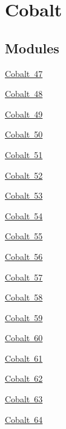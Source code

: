 \hypertarget{group___isotope_const-_cobalt}{}\section{Cobalt}
\label{group___isotope_const-_cobalt}
\subsection*{Modules}
\begin{DoxyCompactItemize}
\item 
\mbox{\hyperlink{group___isotope_const-_cobalt-_co47}{Cobalt 47}}
\item 
\mbox{\hyperlink{group___isotope_const-_cobalt-_co48}{Cobalt 48}}
\item 
\mbox{\hyperlink{group___isotope_const-_cobalt-_co49}{Cobalt 49}}
\item 
\mbox{\hyperlink{group___isotope_const-_cobalt-_co50}{Cobalt 50}}
\item 
\mbox{\hyperlink{group___isotope_const-_cobalt-_co51}{Cobalt 51}}
\item 
\mbox{\hyperlink{group___isotope_const-_cobalt-_co52}{Cobalt 52}}
\item 
\mbox{\hyperlink{group___isotope_const-_cobalt-_co53}{Cobalt 53}}
\item 
\mbox{\hyperlink{group___isotope_const-_cobalt-_co54}{Cobalt 54}}
\item 
\mbox{\hyperlink{group___isotope_const-_cobalt-_co55}{Cobalt 55}}
\item 
\mbox{\hyperlink{group___isotope_const-_cobalt-_co56}{Cobalt 56}}
\item 
\mbox{\hyperlink{group___isotope_const-_cobalt-_co57}{Cobalt 57}}
\item 
\mbox{\hyperlink{group___isotope_const-_cobalt-_co58}{Cobalt 58}}
\item 
\mbox{\hyperlink{group___isotope_const-_cobalt-_co59}{Cobalt 59}}
\item 
\mbox{\hyperlink{group___isotope_const-_cobalt-_co60}{Cobalt 60}}
\item 
\mbox{\hyperlink{group___isotope_const-_cobalt-_co61}{Cobalt 61}}
\item 
\mbox{\hyperlink{group___isotope_const-_cobalt-_co62}{Cobalt 62}}
\item 
\mbox{\hyperlink{group___isotope_const-_cobalt-_co63}{Cobalt 63}}
\item 
\mbox{\hyperlink{group___isotope_const-_cobalt-_co64}{Cobalt 64}}
\item 

\end{DoxyCompactItemize}
